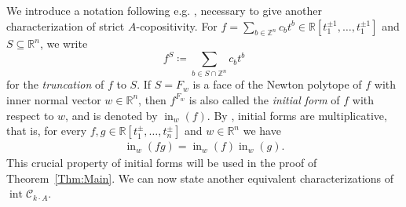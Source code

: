 \documentclass[a4paper,11pt]{amsart}
\theoremstyle{definition}
\DeclareMathOperator{\initial}{in}
\DeclareMathOperator{\interior}{int}
\newcommand{\ZZ}{\mathbb{Z}}
\newcommand{\RR}{\mathbb{R}}
\begin{document}
We introduce a notation following e.g. \cite{Bihan2002}, necessary to give another characterization of strict $A$-copositivity.
For $f = \sum_{b \in \ZZ^n} c_b t^b \in \RR[t_1^{\pm 1}, \dots , t_1^{\pm 1}]$ and $S \subseteq \RR^n$, we write
    \[
        f^S \coloneqq \sum_{b \in S \cap \ZZ^n} c_b t^b
    \]
    for the \emph{truncation} of $f$ to $S$.
If $S = F_w$ is a face of the Newton polytope of $f$ with inner normal vector $w \in \mathbb{R}^n$, then $f^{F_w}$ is also called the \emph{initial form} of $f$ with respect to $w$, and is denoted by $\initial_w(f)$. By \cite[Lemma~2.6.2]{MaclaganSturmfels}, initial forms are multiplicative, that is, for every $f,g \in \mathbb{R}[t_1^\pm, \dots , t_n^\pm]$ and $w \in \mathbb{R}^n$ we have 
\begin{align}
\label{Eq:InitialFormsFactor}
    \initial_w(fg) = \initial_w(f) \initial_w(g).
\end{align}
This crucial property of initial forms will be used in the proof of Theorem~\ref{Thm:Main}.
We can now state another equivalent characterizations of $\interior \mathcal{C}_{k\cdot A}$.
\end{document}
